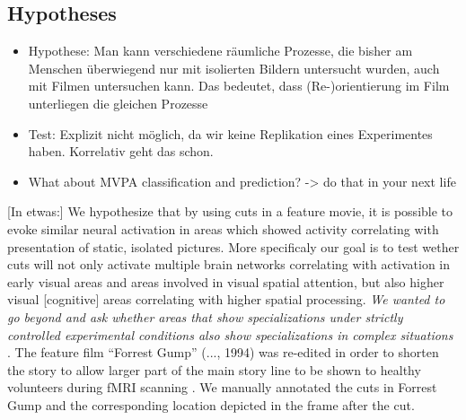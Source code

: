 \documentclass[10pt,a4paper,twocolumn]{article}
\begin{document}
\subsection{Hypotheses }
\begin{itemize}
	\item Hypothese: Man kann verschiedene räumliche Prozesse, die bisher am
	Menschen überwiegend nur mit isolierten Bildern untersucht wurden,
	auch mit Filmen untersuchen kann. Das bedeutet, dass (Re-)orientierung
	im Film unterliegen die gleichen Prozesse
	\item Test: Explizit nicht möglich, da wir keine Replikation eines Experimentes
	haben. Korrelativ geht das schon. 
	\item What about MVPA classification and prediction? -> do that in your
	next life
\end{itemize}
{[}In etwas:{]} We hypothesize that by using cuts in a feature movie,
it is possible to evoke similar neural activation in areas which showed
activity correlating with presentation of static, isolated pictures.
More specificaly our goal is to test wether cuts will not only activate
multiple brain networks correlating with activation in early visual
areas and areas involved in visual spatial attention, but also higher
visual {[}cognitive{]} areas correlating with higher spatial processing.
\emph{We wanted to go beyond and ask whether areas that show specializations
	under strictly controlled experimental conditions also show specializations
	in complex situations \citet{bartels_2004_mapping_during_free_viewing}}.
The feature film ``Forrest Gump'' (..., 1994) was re-edited in order
to shorten the story to allow larger part of the main story line to
be shown to healthy volunteers during fMRI scanning \citep{hanke_2016_simultaneous_fMRI_eye_gaze}.
We manually annotated the cuts in Forrest Gump and the corresponding
location depicted in the frame after the cut. 
\end{document}
